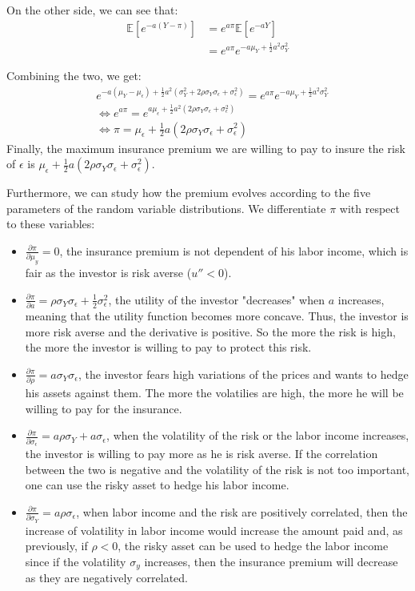 \documentclass[10pt]{article}
\newcommand{\Ebb}{\mathbb{E}}
\newenvironment{exercise}[2][Exercise]{\begin{trivlist}
  \item[\hskip \labelsep {\bfseries #1}\hskip \labelsep {\bfseries #2.}]}{\end{trivlist}}
\begin{document}
\begin{exercise}{1}
On the other side, we can see that:
\begin{align*}
  \Ebb[e^{-a(Y-\pi)}] &= e^{a\pi}\Ebb[e^{-aY}] \\
  &= e^{a\pi}e^{-a\mu_Y + \frac{1}{2}a^2\sigma_Y^2}
\end{align*}
 
Combining the two, we get:
\begin{align*}
  &e^{-a(\mu_Y-\mu_\epsilon) +\frac{1}{2}a^2(\sigma_Y^2 + 2\rho\sigma_Y\sigma_\epsilon + \sigma_\epsilon^2)} = e^{a\pi}e^{-a\mu_Y + \frac{1}{2}a^2\sigma_Y^2}\\
  &\iff e^{a\pi} = e^{a\mu_\epsilon +\frac{1}{2}a^2(2\rho\sigma_Y\sigma_\epsilon + \sigma_\epsilon^2)}\\
  &\iff \pi = \mu_\epsilon + \frac{1}{2}a(2\rho\sigma_Y\sigma_\epsilon + \sigma_\epsilon^2)
\end{align*}
Finally, the maximum insurance premium we are willing to pay to insure the risk of $\epsilon$ is $\mu_\epsilon + \frac{1}{2}a(2\rho\sigma_Y\sigma_\epsilon + \sigma_\epsilon^2)$.

Furthermore, we can study how the premium evolves according to the five parameters of the random variable distributions. 
We differentiate $\pi$ with respect to these variables:
\begin{itemize}
  \item $\frac{\partial\pi}{\partial\mu_y} = 0$, the insurance premium is not dependent of his labor income, which is fair as the investor is risk averse ($u'' <0$).
  \item $\frac{\partial\pi}{\partial a} = \rho\sigma_Y\sigma_\epsilon + \frac{1}{2}\sigma_\epsilon^2$, the utility of the investor "decreases" when $a$ increases, meaning that the utility function becomes more concave. Thus, the investor is more risk averse and the derivative is positive. So the more the risk is high, the more the investor is willing to pay to protect this risk.
  \item $\frac{\partial\pi}{\partial\rho} = a\sigma_Y\sigma_\epsilon$, the investor fears high variations of the prices and wants to hedge his assets against them. The more the volatilies are high, the more he will be willing to pay for the insurance.
  \item $\frac{\partial\pi}{\partial\sigma_\epsilon} = a\rho\sigma_Y + a\sigma_\epsilon$, when the volatility of the risk or the labor income increases, the investor is willing to pay more as he is risk averse. If the correlation between the two is negative and the volatility of the risk is not too important, one can use the risky asset to hedge his labor income. 
  \item $\frac{\partial\pi}{\partial\sigma_Y} = a\rho\sigma_\epsilon$, when labor income and the risk are positively correlated, then the increase of volatility in labor income would increase the amount paid and, as previously, if $\rho <0$, the risky asset can be used to hedge the labor income since if the volatility $\sigma_y$ increases, then the insurance premium will decrease as they are negatively correlated. 
\end{itemize}

  \end{exercise}
\end{document}
